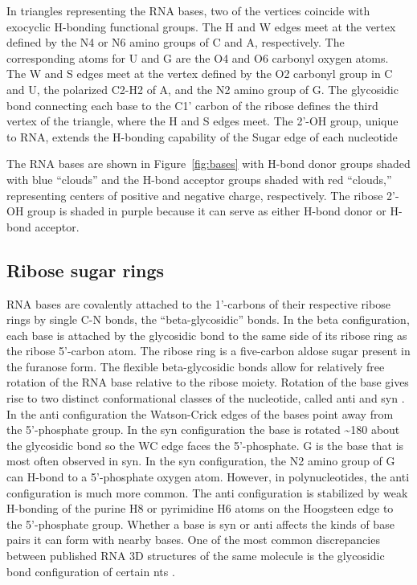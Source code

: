 In triangles representing the RNA bases, two of the vertices coincide with
exocyclic H-bonding functional groups. The H and W edges meet at the vertex
defined by the N4 or N6 amino groups of C and A, respectively. The corresponding
atoms for U and G are the O4 and O6 carbonyl oxygen atoms. The W and S edges
meet at the vertex defined by the O2 carbonyl group in C and U, the polarized
C2-H2 of A, and the N2 amino group of G. The glycosidic bond connecting each
base to the C1’ carbon of the ribose defines the third vertex of the triangle,
where the H and S edges meet. The 2'-OH group, unique to RNA, extends the
H-bonding capability of the Sugar edge of each nucleotide

The RNA bases are shown in Figure~\ref{fig:bases} with H-bond donor groups
shaded with blue ``clouds'' and the H-bond acceptor groups shaded with red
``clouds,'' representing centers of positive and negative charge, respectively.
The ribose 2'-OH group is shaded in purple because it can serve as either H-bond
donor or H-bond acceptor. 

\subsection{Ribose sugar rings}

RNA bases are covalently attached to the 1'-carbons of their respective ribose
rings by single C-N bonds, the ``beta-glycosidic'' bonds. In the beta
configuration, each base is attached by the glycosidic bond to the same side of
its ribose ring as the ribose 5'-carbon atom. The ribose ring is a five-carbon
aldose sugar present in the furanose form. The flexible beta-glycosidic bonds
allow for relatively free rotation of the RNA base relative to the ribose
moiety. Rotation of the base gives rise to two distinct conformational classes
of the nucleotide, called anti and syn \cite{Neidle2008}. In the anti
configuration the Watson-Crick edges of the bases point away from the
5’-phosphate group. In the syn configuration the base is rotated \textasciitilde 180\degree
about the glycosidic bond so the WC edge faces the 5'-phosphate. G is the base
that is most often observed in syn. In the syn configuration, the N2 amino group
of G can H-bond to a 5'-phosphate oxygen atom. However, in polynucleotides, the
anti configuration is much more common. The anti configuration is stabilized by
weak H-bonding of the purine H8 or pyrimidine H6 atoms on the Hoogsteen edge to
the 5'-phosphate group. Whether a base is syn or anti affects the kinds of base
pairs it can form with nearby bases. One of the most common discrepancies
between published RNA 3D structures of the same molecule is the glycosidic bond
configuration of certain nts \cite{Leontis2002f}. 

